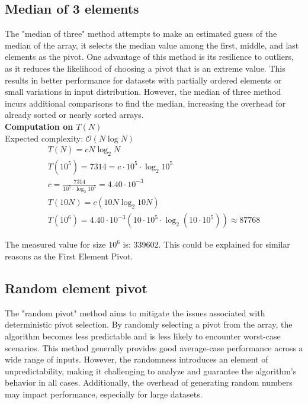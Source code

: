 \documentclass{article}
\begin{document}
\subsection{Median of 3 elements}

The "median of three" method attempts to make an estimated guess of the median of the array, it selects the median value among the first, middle, and last elements as the pivot. One advantage of this method is its resilience to outliers, as it reduces the likelihood of choosing a pivot that is an extreme value. This results in better performance for datasets with partially ordered elements or small variations in input distribution. However, the median of three method incurs additional comparisons to find the median, increasing the overhead for already sorted or nearly sorted arrays. \\

\textbf{Computation on $T(N)$}\\
Expected complexity: $\mathcal{O}(N \log N)$\\

\[
\begin{gathered}
    T(N) = cN \log_2 N \\
    T(10^5) = 7314 = c \cdot 10^5 \cdot \log_2 10^5 \\
    c = \frac{7314}{10^5 \cdot \log_2 10^5} = 4.40 \cdot 10^{-3} \\
    T(10N) = c(10N \log_2 10N) \\
    T(10^6) = 4.40 \cdot 10^{-3}(10 \cdot 10^5 \cdot \log_2 (10 \cdot 10^5)) \approx 87768
\end{gathered}
\]

The measured value for size $10^6$ is: 339602. This could be explained for similar reasons as the First Element Pivot.


\subsection{Random element pivot}

The "random pivot" method aims to mitigate the issues associated with deterministic pivot selection. By randomly selecting a pivot from the array, the algorithm becomes less predictable and is less likely to encounter worst-case scenarios. This method generally provides good average-case performance across a wide range of inputs. However, the randomness introduces an element of unpredictability, making it challenging to analyze and guarantee the algorithm's behavior in all cases. Additionally, the overhead of generating random numbers may impact performance, especially for large datasets. \\
\end{document}
